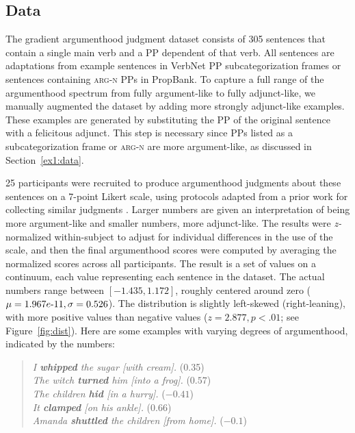 \documentclass[letterpaper]{article} %
\begin{document}
\subsection{Data}
The gradient argumenthood judgment dataset consists of 305 sentences that contain a single main verb and a PP dependent of that verb. All sentences are adaptations from example sentences in VerbNet PP subcategorization frames or sentences containing \textsc{arg-n} PPs in PropBank. To capture a full range of the argumenthood spectrum from fully argument-like to fully adjunct-like, we manually augmented the dataset by adding more strongly adjunct-like examples. These examples are generated by substituting the PP of the original sentence with a felicitous adjunct. This step is necessary since PPs listed as a subcategorization frame or \textsc{arg-n} are more argument-like, as discussed in Section~\ref{ex1:data}.

25 participants were recruited to produce argumenthood judgments about these sentences on a 7-point Likert scale, using protocols adapted from a prior work for collecting similar judgments \cite{rissman2015using}. Larger numbers are given an interpretation of being more argument-like and smaller numbers, more adjunct-like. The results were \textit{z-}normalized within-subject to adjust for individual differences in the use of the scale, and then the final argumenthood scores were computed by averaging the normalized scores across all participants. The result is a set of values on a continuum, each value representing each sentence in the dataset. The actual numbers range between $[-1.435, 1.172]$, roughly centered around zero ($\mu=1.967e\textnormal{-}11, \sigma=0.526$). The distribution is slightly left-skewed (right-leaning), with more positive values than negative values ($z=2.877, p<.01$; see Figure~\ref{fig:dist}). Here are some examples with varying degrees of argumenthood, indicated by the numbers:

\begin{quote}
	\textit{I \textbf{whipped} the sugar [with cream].} (0.35)\\
	\hspace{-0.5cm}\textit{The witch \textbf{turned} him [into a frog].} ($0.57$) \\
	\hspace{-0.5cm}\textit{The children \textbf{hid} [in a hurry].} ($-0.41$) \\
	\hspace{-0.5cm}\textit{It \textbf{clamped} [on his ankle].} ($0.66$) \\
	\hspace{-0.5cm}\textit{Amanda \textbf{shuttled} the children [from home].} ($-0.1$)
\end{quote}
\end{document}
